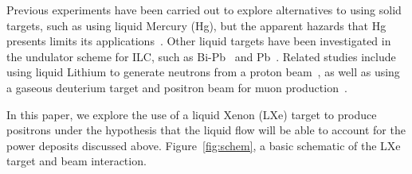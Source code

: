 \documentclass[%
reprint,
nofootinbib,
amsmath, amssymb,
aps,
floatfix,
]{revtex4-2}
\begin{document}

Previous experiments have been carried out to explore alternatives to using solid targets, such as using 
liquid Mercury (Hg), but the apparent hazards that Hg presents limits its applications~\cite{Mikhailichenko2006}.
Other liquid targets have been investigated in the undulator scheme for ILC, such as Bi-Pb~\cite{Mikhailichenko2006} and Pb~\cite{Sheppard2002}.
Related studies include using liquid Lithium to generate neutrons from a proton beam~\cite{Feinberg2011}, as well as using a gaseous deuterium
target and positron beam for muon production~\cite{Okita2020}.



In this paper, we explore the use of a liquid Xenon (LXe) target to produce positrons
under the hypothesis that the liquid flow will be able to account for the power deposits
discussed above.
Figure~\ref{fig:schem}, a basic schematic of the LXe target and beam interaction.
\end{document}
